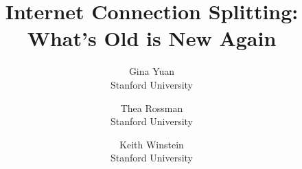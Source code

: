 \title{\Large \bf Internet Connection Splitting: What's Old is New Again}

\author{
{\rm Gina Yuan}\\
Stanford University
\and
{\rm Thea Rossman}\\
Stanford University
\and
{\rm Keith Winstein}\\
Stanford University
} %

\maketitle








% 
% 






\newpage
\appendix




